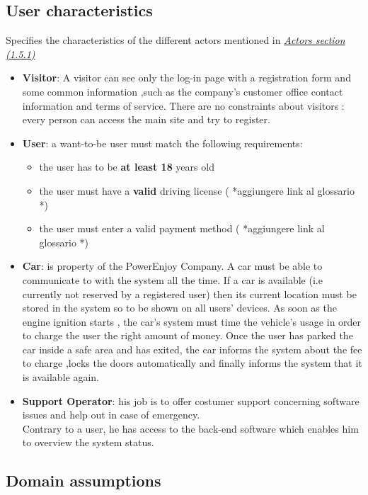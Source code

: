 \documentclass[12pt]{article}
\begin{document}
	\subsection{User characteristics}
	Specifies the characteristics of the different actors mentioned in \hyperref[actors:3]{\textit{Actors section (1.5.1)}} 
	\begin{itemize}
	\item \textbf{Visitor}: A visitor can see only the log-in page with a registration form and some common information ,such as the company's customer office contact information and terms of service. There are no constraints about visitors : every person can access the main site and try to register.
	\item \textbf{User}: a want-to-be user must match the following requirements:
	\begin{itemize}
		\item the user has to be \textbf{at least 18} years old
		\item the user must have a \textbf{valid} driving license ( *aggiungere link al glossario *)
		\item the user must enter a valid payment method ( *aggiungere link al glossario *)
	\end{itemize}
	\item \textbf{Car}: is property of the PowerEnjoy Company. A car must be able to communicate to with the system all the time. If a car is available (i.e currently not reserved by a registered user) then its current location must be stored in the system so to be shown on all users' devices. As soon as the engine ignition starts , the car's system must time the vehicle's usage in order to charge the user the right amount of money. Once the user has parked the car inside a safe area and has exited, the car informs the system about the fee to charge ,locks the doors automatically and finally informs the system that it is available again.
	\item \textbf{Support Operator}: his job is to offer costumer support concerning software issues and help out in case of emergency.\\ Contrary to a user, he has access to the back-end software which enables him to overview the system status.
	\end{itemize}
	
	
	\subsection{Domain assumptions}
\end{document}
